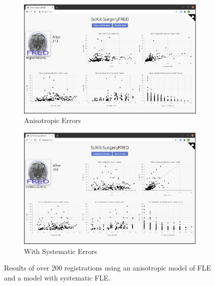 \begin{figure}
	\begin{center}
		\begin{subfigure}[b]{0.48\linewidth}
			\includegraphics[width=\linewidth]{images/anisitropic_error.eps}
			\caption{\label{fig:anis_error}Anisotropic Errors}
		\end{subfigure}
		\begin{subfigure}[b]{0.48\linewidth}
			\includegraphics[width=\linewidth]{images/systematic_error.eps}
			\caption{\label{fig:sys_error}With Systematic Errors}
		\end{subfigure}
		\caption{\label{fig:other_errors}Results of over 200 registrations using an anisotropic model of {FLE} and a model with systematic {FLE}.}
	\end{center}
\end{figure}

